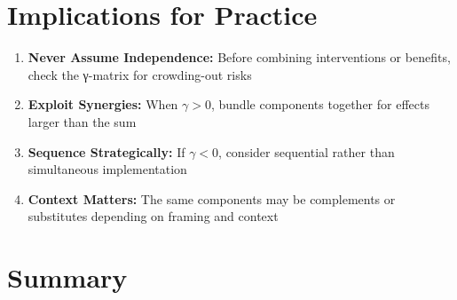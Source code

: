 \section{Implications for Practice}
\label{sec:how-practice}

\begin{tcolorbox}[colback=green!5!white, colframe=green!75!black,
    title=Practical Implications]
\begin{enumerate}
\item \textbf{Never Assume Independence:} Before combining interventions or
      benefits, check the γ-matrix for crowding-out risks
\item \textbf{Exploit Synergies:} When $\gamma > 0$, bundle components together
      for effects larger than the sum
\item \textbf{Sequence Strategically:} If $\gamma < 0$, consider sequential
      rather than simultaneous implementation
\item \textbf{Context Matters:} The same components may be complements or
      substitutes depending on framing and context
\end{enumerate}
\end{tcolorbox}


\section{Summary}
\label{sec:how-summary}


